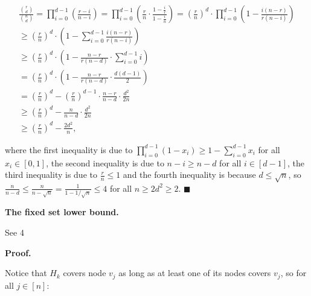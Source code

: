 \[\begin{gathered}
\displaystyle\frac{\binom{r}{d}}{\binom{n}{d}}=\prod_{i=0}^{d-1}\left(\frac{r-i}{n-i}\right)=\prod_{i=0}^{d-1}\left(\frac{r}{n}\cdot\frac{1-\frac{i}{r}}{1-\frac{i}{n}}\right) \displaystyle=\left(\frac{r}{n}\right)^{d}\cdot\prod_{i=0}^{d-1}\left(1-\frac{i(n-r)}{r(n-i)}\right) \\
\displaystyle\geq\left(\frac{r}{n}\right)^{d}\cdot\left(1-\sum_{i=0}^{d-1}\frac{i(n-r)}{r(n-i)}\right) \\
\displaystyle\geq\left(\frac{r}{n}\right)^{d}\cdot\left(1-\frac{n-r}{r(n-d)}\cdot\sum_{i=0}^{d-1}i\right) \\
\displaystyle=\left(\frac{r}{n}\right)^{d}\cdot\left(1-\frac{n-r}{r(n-d)}\cdot\frac{d(d-1)}{2}\right) \\
\displaystyle=\left(\frac{r}{n}\right)^{d}-\left(\frac{r}{n}\right)^{d-1}\cdot\frac{n-r}{n-d}\cdot\frac{d^{2}}{2n} \\
\displaystyle\geq\left(\frac{r}{n}\right)^{d}-\frac{n}{n-d}\cdot\frac{d^{2}}{2n} \\
\displaystyle\geq\left(\frac{r}{n}\right)^{d}-\frac{2d^{2}}{n},
\end{gathered}\]


where the first inequality is due to $\prod_{i=0}^{d-1}(1-x_{i})\geq 1-\sum_{i=0}^{d-1}x_{i}$ for all $x_{i}\in[0,1]$, the second inequality is due to $n-i\geq n-d$ for all $i\in[d-1]$, the third inequality is due to $\frac{r}{n}\leq 1$ and the fourth inequality is because $d\leq\sqrt{n}$, so $\frac{n}{n-d}\leq\frac{n}{n-\sqrt{n}}=\frac{1}{1-1/\sqrt{n}}\leq 4$ for all $n\geq 2d^{2}\geq 2$.
\ensuremath{\blacksquare}\par






\par\medskip\noindent\textbf{The fixed set lower bound.}\par




See 4\par




\par\medskip\noindent\textbf{Proof.}\par



Notice that $H_{k}$ covers node $v_{j}$ as long as at least one of its nodes covers $v_{j}$, so for all $j\in[n]$:\par


